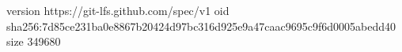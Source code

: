 version https://git-lfs.github.com/spec/v1
oid sha256:7d85ce231ba0e8867b20424d97bc316d925e9a47caac9695c9f6d0005abedd40
size 349680

